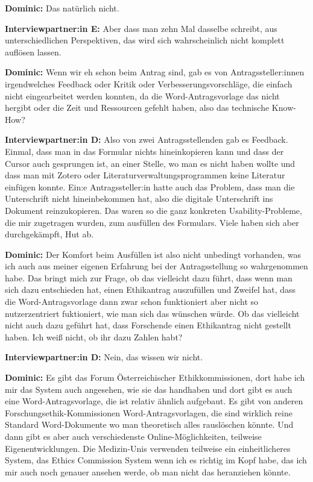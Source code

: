 \documentclass[a4paper,12pt,twoside]{scrreprt}
\begin{document}
\textbf{Dominic:} Das natürlich nicht.

\textbf{Interviewpartner:in E:} Aber dass man zehn Mal dasselbe schreibt, aus unterschiedlichen Perspektiven, das wird sich wahrscheinlich nicht komplett auflösen lassen.

\textbf{Dominic:} Wenn wir eh schon beim Antrag sind, gab es von Antragssteller:innen irgendwelches Feedback oder Kritik oder Verbesserungsvorschläge, die einfach nicht eingearbeitet werden konnten, da die Word-Antragsvorlage das nicht hergibt oder die Zeit und Ressourcen gefehlt haben, also das technische Know-How?

\textbf{Interviewpartner:in D:} Also von zwei Antragsstellenden gab es Feedback. Einmal, dass man in das Formular nichts hineinkopieren kann und dass der Cursor auch gesprungen ist, an einer Stelle, wo man es nicht haben wollte und dass man mit Zotero oder Literaturverwaltungsprogrammen keine Literatur einfügen konnte. Ein:e Antragssteller:in hatte auch das Problem, dass man die Unterschrift nicht hineinbekommen hat, also die digitale Unterschrift ins Dokument reinzukopieren. Das waren so die ganz konkreten Usability-Probleme, die mir zugetragen wurden, zum ausfüllen des Formulars. Viele haben sich aber durchgekämpft, Hut ab.

\textbf{Dominic:} Der Komfort beim Ausfüllen ist also nicht unbedingt vorhanden, was ich auch aus meiner eigenen Erfahrung bei der Antragsstellung so wahrgenommen habe. Das bringt mich zur Frage, ob das vielleicht dazu führt, dass wenn man sich dazu entschieden hat, einen Ethikantrag auszufüllen und Zweifel hat, dass die Word-Antragsvorlage dann zwar schon funktioniert aber nicht so nutzerzentriert fuktioniert, wie man sich das wünschen würde. Ob das vielleicht nicht auch dazu geführt hat, dass Forschende einen Ethikantrag nicht gestellt haben. Ich weiß nicht, ob ihr dazu Zahlen habt?

\textbf{Interviewpartner:in D:} Nein, das wissen wir nicht.

\textbf{Dominic:} Es gibt das Forum Österreichischer Ethikkommissionen, dort habe ich mir das System auch angesehen, wie sie das handhaben und dort gibt es auch eine Word-Antragsvorlage, die ist relativ ähnlich aufgebaut. Es gibt von anderen Forschungsethik-Kommissionen Word-Antragsvorlagen, die sind wirklich reine Standard Word-Dokumente wo man theoretisch alles rauslöschen könnte. Und dann gibt es aber auch verschiedenste Online-Möglichkeiten, teilweise Eigenentwicklungen. Die Medizin-Unis verwenden teilweise ein einheitlicheres System, das Ethics Commission System wenn ich es richtig im Kopf habe, das ich mir auch noch genauer ansehen werde, ob man nicht das heranziehen könnte.
\end{document}
